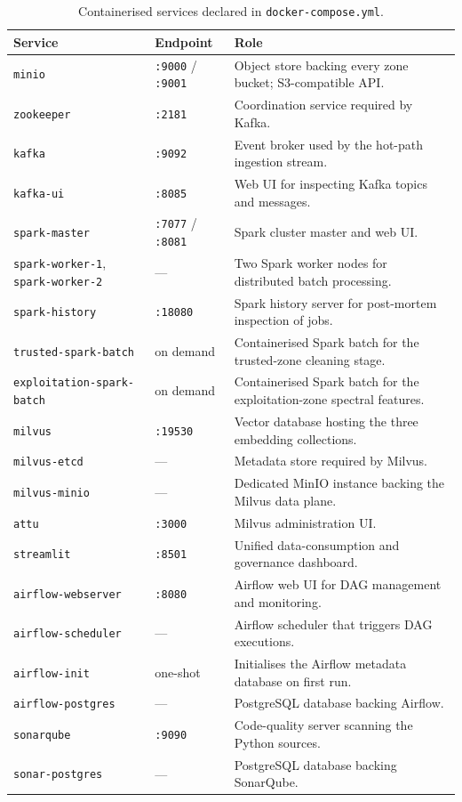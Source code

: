 \documentclass[11pt,a4paper]{article}
\begin{document}
\begin{table}[H]
\centering
\footnotesize
\renewcommand{\arraystretch}{1.15}
\begin{tabularx}{\textwidth}{@{}p{4.0cm}p{2.3cm}X@{}}
\toprule
\textbf{Service} & \textbf{Endpoint} & \textbf{Role}\\
\midrule
\texttt{minio} & \texttt{:9000} / \texttt{:9001} & Object store backing every zone bucket; S3-compatible API.\\
\texttt{zookeeper} & \texttt{:2181} & Coordination service required by Kafka.\\
\texttt{kafka} & \texttt{:9092} & Event broker used by the hot-path ingestion stream.\\
\texttt{kafka-ui} & \texttt{:8085} & Web UI for inspecting Kafka topics and messages.\\
\texttt{spark-master} & \texttt{:7077} / \texttt{:8081} & Spark cluster master and web UI.\\
\texttt{spark-worker-1}, \texttt{spark-worker-2} & --- & Two Spark worker nodes for distributed batch processing.\\
\texttt{spark-history} & \texttt{:18080} & Spark history server for post-mortem inspection of jobs.\\
\texttt{trusted-spark-batch} & on demand & Containerised Spark batch for the trusted-zone cleaning stage.\\
\texttt{exploitation-spark-batch} & on demand & Containerised Spark batch for the exploitation-zone spectral features.\\
\texttt{milvus} & \texttt{:19530} & Vector database hosting the three embedding collections.\\
\texttt{milvus-etcd} & --- & Metadata store required by Milvus.\\
\texttt{milvus-minio} & --- & Dedicated MinIO instance backing the Milvus data plane.\\
\texttt{attu} & \texttt{:3000} & Milvus administration UI.\\
\texttt{streamlit} & \texttt{:8501} & Unified data-consumption and governance dashboard.\\
\texttt{airflow-webserver} & \texttt{:8080} & Airflow web UI for DAG management and monitoring.\\
\texttt{airflow-scheduler} & --- & Airflow scheduler that triggers DAG executions.\\
\texttt{airflow-init} & one-shot & Initialises the Airflow metadata database on first run.\\
\texttt{airflow-postgres} & --- & PostgreSQL database backing Airflow.\\
\texttt{sonarqube} & \texttt{:9090} & Code-quality server scanning the Python sources.\\
\texttt{sonar-postgres} & --- & PostgreSQL database backing SonarQube.\\
\bottomrule
\end{tabularx}
\caption{Containerised services declared in \texttt{docker-compose.yml}.}
\label{tab:containers}
\end{table}
\end{document}
